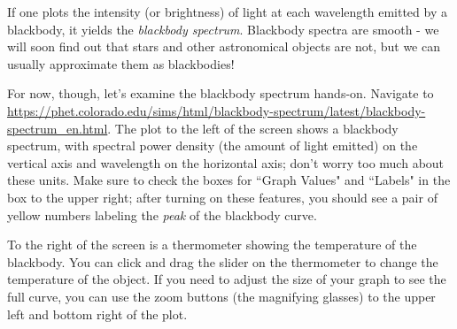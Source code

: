 \documentclass[11pt]{article}
\begin{document}
If one plots the intensity (or brightness) of light at each wavelength emitted by a blackbody, it yields the \emph{blackbody spectrum}. Blackbody spectra are smooth - we will soon find out that stars and other astronomical objects are not, but we can usually approximate them as blackbodies! 

For now, though, let's examine the blackbody spectrum hands-on. Navigate to \url{https://phet.colorado.edu/sims/html/blackbody-spectrum/latest/blackbody-spectrum_en.html}. The plot to the left of the screen shows a blackbody spectrum, with spectral power density (the amount of light emitted) on the vertical axis and wavelength on the horizontal axis; don't worry too much about these units. Make sure to check the boxes for ``Graph Values" and ``Labels" in the box to the upper right; after turning on these features, you should see a pair of yellow numbers labeling the \emph{peak} of the blackbody curve.

To the right of the screen is a thermometer showing the temperature of the blackbody. You can click and drag the slider on the thermometer to change the temperature of the object. If you need to adjust the size of your graph to see the full curve, you can use the zoom buttons (the magnifying glasses) to the upper left and bottom right of the plot.
\end{document}
